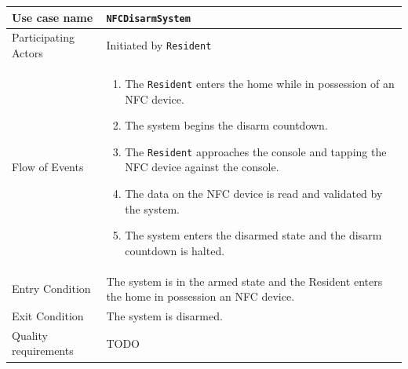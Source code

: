 \documentclass{report}
\begin{document}
\newlength{\originalParindent}
\setlength{\originalParindent}{\parindent}
\newlength{\originalParskip}
\setlength{\originalParskip}{\parskip}
\parindent 0pt
\parskip 10pt

\begin{tabular}{| l | p{12cm} |}
\hline
Use case name & \texttt{NFCDisarmSystem} \\ \hline
Participating Actors & Initiated by \texttt{Resident} \\ \hline
Flow of Events & 

\begin{enumerate}
 \item The \texttt{Resident} enters the home while in possession of an NFC 
        device.
 \item The system begins the disarm countdown.
 \item The \texttt{Resident} approaches the console and tapping the NFC device
       against the console.
 \item The data on the NFC device is read and validated by the system.
 \item The system enters the disarmed state and the disarm countdown is halted.
\end{enumerate}

\\ \hline

Entry Condition & The system is in the armed state and the Resident enters the
home in possession an NFC device. \\ \hline

Exit Condition & The system is disarmed. \\ \hline
Quality requirements & TODO \\ \hline

\hline
\end{tabular}
\end{document}
